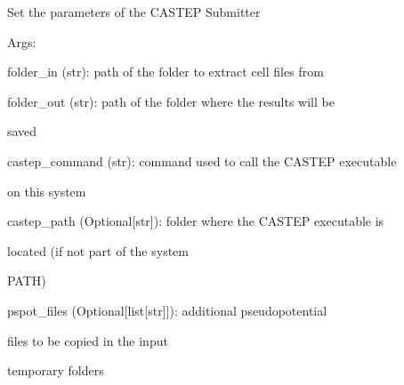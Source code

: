 \documentclass[letterpaper,10pt,english]{sphinxmanual}
\begin{document}
\begin{fulllineitems}
\begin{fulllineitems}
\end{fulllineitems}


\begin{fulllineitems}
\label{doctree/soprano.hpc.submitter.castep:soprano.hpc.submitter.castep.CastepSubmitter.set_parameters}
Set the parameters of the CASTEP Submitter

\begin{DUlineblock}{0em}
\item[] Args:
\item[]
\begin{DUlineblock}{\DUlineblockindent}
\item[] folder\_in (str): path of the folder to extract cell files from
\item[] folder\_out (str): path of the folder where the results will be
\item[]
\begin{DUlineblock}{\DUlineblockindent}
\item[] saved
\end{DUlineblock}
\item[] castep\_command (str): command used to call the CASTEP executable
\item[]
\begin{DUlineblock}{\DUlineblockindent}
\item[] on this system
\end{DUlineblock}
\item[] castep\_path (Optional{[}str{]}): folder where the CASTEP executable is
\item[]
\begin{DUlineblock}{\DUlineblockindent}
\item[] located (if not part of the system
\item[] PATH)
\end{DUlineblock}
\item[] pspot\_files (Optional{[}list{[}str{]}{]}): additional pseudopotential
\item[]
\begin{DUlineblock}{\DUlineblockindent}
\item[] files to be copied in the input
\item[] temporary folders
\end{DUlineblock}

\end{DUlineblock}
\end{DUlineblock}
\end{fulllineitems}
\end{fulllineitems}
\end{document}
